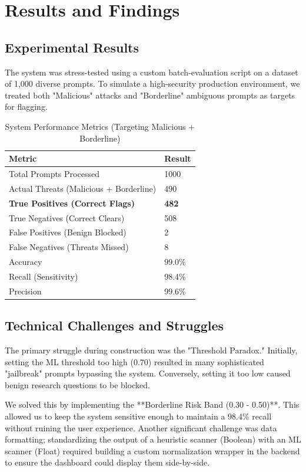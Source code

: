 \documentclass{article}
\begin{document}
\section{Results and Findings}

\subsection{Experimental Results}
The system was stress-tested using a custom batch-evaluation script on a dataset of 1,000 diverse prompts. To simulate a high-security production environment, we treated both "Malicious" attacks and "Borderline" ambiguous prompts as targets for flagging.

\begin{table}[ht]
\caption{System Performance Metrics (Targeting Malicious + Borderline)}
\centering
\begin{tabular}{ll}
\toprule
\textbf{Metric} & \textbf{Result} \\
\midrule
Total Prompts Processed & 1000 \\
Actual Threats (Malicious + Borderline) & 490 \\
\midrule
\textbf{True Positives (Correct Flags)} & \textbf{482} \\
True Negatives (Correct Clears) & 508 \\
False Positives (Benign Blocked) & 2 \\
False Negatives (Threats Missed) & 8 \\
\midrule
Accuracy & 99.0\% \\
Recall (Sensitivity) & 98.4\% \\
Precision & 99.6\% \\
\bottomrule
\end{tabular}
\label{tab:results}
\end{table}

\subsection{Technical Challenges and Struggles}
The primary struggle during construction was the "Threshold Paradox." Initially, setting the ML threshold too high (0.70) resulted in many sophisticated "jailbreak" prompts bypassing the system. Conversely, setting it too low caused benign research questions to be blocked. 

We solved this by implementing the **Borderline Risk Band (0.30 - 0.50)**. This allowed us to keep the system sensitive enough to maintain a 98.4\% recall without ruining the user experience. Another significant challenge was data formatting; standardizing the output of a heuristic scanner (Boolean) with an ML scanner (Float) required building a custom normalization wrapper in the backend to ensure the dashboard could display them side-by-side.
\end{document}
